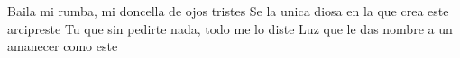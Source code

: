 \endverse

\beginverse
    Baila mi rumba, mi doncella de ojos tristes
    Se la unica diosa en la que crea este arcipreste
    Tu que sin pedirte nada, todo me lo diste
    Luz que le das nombre a un amanecer como este
\endverse